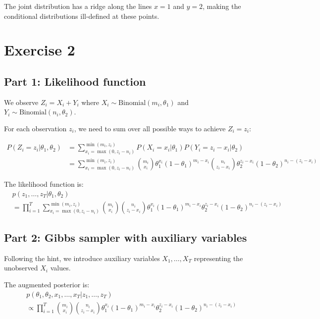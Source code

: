\documentclass[11pt,a4paper]{article}
\begin{document}
The joint distribution has a ridge along the lines $x = 1$ and $y = 2$, making the conditional distributions ill-defined at these points.

\section{Exercise 2}

\subsection{Part 1: Likelihood function}

We observe $Z_i = X_i + Y_i$ where $X_i \sim \text{Binomial}(m_i, \theta_1)$ and $Y_i \sim \text{Binomial}(n_i, \theta_2)$.

For each observation $z_i$, we need to sum over all possible ways to achieve $Z_i = z_i$:

\begin{align}
P(Z_i = z_i | \theta_1, \theta_2) &= \sum_{x_i=\max(0, z_i-n_i)}^{\min(m_i, z_i)} P(X_i = x_i | \theta_1) P(Y_i = z_i - x_i | \theta_2)\\
&= \sum_{x_i=\max(0, z_i-n_i)}^{\min(m_i, z_i)} \binom{m_i}{x_i} \theta_1^{x_i} (1-\theta_1)^{m_i-x_i} \binom{n_i}{z_i-x_i} \theta_2^{z_i-x_i} (1-\theta_2)^{n_i-(z_i-x_i)}
\end{align}

The likelihood function is:
\begin{align}
&p(z_1, \ldots, z_T | \theta_1, \theta_2) \\
&= \prod_{i=1}^T \sum_{x_i=\max(0, z_i-n_i)}^{\min(m_i, z_i)} \binom{m_i}{x_i} \binom{n_i}{z_i-x_i} \theta_1^{x_i} (1-\theta_1)^{m_i-x_i} \theta_2^{z_i-x_i} (1-\theta_2)^{n_i-(z_i-x_i)}
\end{align}

\subsection{Part 2: Gibbs sampler with auxiliary variables}

Following the hint, we introduce auxiliary variables $X_1, \ldots, X_T$ representing the unobserved $X_i$ values.

The augmented posterior is:
\begin{align}
&p(\theta_1, \theta_2, x_1, \ldots, x_T | z_1, \ldots, z_T) \\
&\propto \prod_{i=1}^T \binom{m_i}{x_i} \binom{n_i}{z_i-x_i} \theta_1^{x_i} (1-\theta_1)^{m_i-x_i} \theta_2^{z_i-x_i} (1-\theta_2)^{n_i-(z_i-x_i)}
\end{align}
\end{document}
